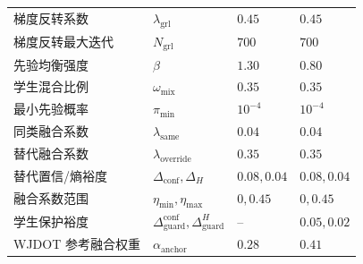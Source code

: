 \documentclass{seuthesis-2022}
\begin{document}
{\begin{longtable}{@{}>{\raggedright\arraybackslash}p{}>{\raggedright\arraybackslash}p{}>{\raggedright\arraybackslash}p{}>{\raggedright\arraybackslash}p{}@{}}
    梯度反转系数 & $\lambda_{\mathrm{grl}}$ & $0.45$ & $0.45$ \\
    梯度反转最大迭代 & $N_{\mathrm{grl}}$ & $700$ & $700$ \\
    先验均衡强度 & $\beta$ & $1.30$ & $0.80$ \\
    学生混合比例 & $\omega_{\mathrm{mix}}$ & $0.35$ & $0.35$ \\
    最小先验概率 & $\pi_{\min}$ & $10^{-4}$ & $10^{-4}$ \\
    同类融合系数 & $\lambda_{\mathrm{same}}$ & $0.04$ & $0.04$ \\
    替代融合系数 & $\lambda_{\mathrm{override}}$ & $0.35$ & $0.35$ \\
    替代置信/熵裕度 & $\Delta_{\mathrm{conf}},\Delta_H$ & $0.08,0.04$ & $0.08,0.04$ \\
    融合系数范围 & $\eta_{\min},\eta_{\max}$ & $0,0.45$ & $0,0.45$ \\
    学生保护裕度 & $\Delta_{\mathrm{guard}}^{\mathrm{conf}},\Delta_{\mathrm{guard}}^H$ & -- & $0.05,0.02$ \\
    WJDOT 参考融合权重 & $\alpha_{\mathrm{anchor}}$ & $0.28$ & $0.41$ \\
\end{longtable}
}
\end{document}
